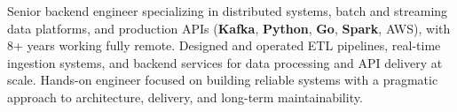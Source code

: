 

\begin{cvparagraph}


Senior backend engineer specializing in distributed systems, batch and streaming data platforms, and production APIs (\textbf{Kafka}, \textbf{Python}, \textbf{Go}, \textbf{Spark}, AWS), with 8+ years working fully remote.\newline
Designed and operated ETL pipelines, real-time ingestion systems, and backend services for data processing and API delivery at scale.\newline
Hands-on engineer focused on building reliable systems with a pragmatic approach to architecture, delivery, and long-term maintainability.
\end{cvparagraph}
